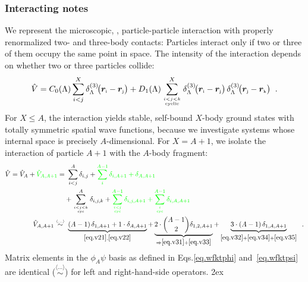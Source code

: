 \documentclass[aps,prd,onecolumn
,tightenlines,letterpaper,
notitlepage,11pt,
nofootinbib]{revtex4-1}
\begin{document}
\subsubsection{Interacting notes}
We represent the microscopic, \ie, particle-particle interaction with properly
renormalized two- and three-body contacts: Particles interact only if two or three
of them occupy the same point in space. The intensity of the interaction depends
on whether two or three particles collide:
\[
\hat{V}=C_0(\Lambda)\sum_{i<j}^X\ddrei{\vsp{i}-\vsp{j}}+
D_1(\Lambda)\sum^X_{i<j<k\atop\text{\tiny cyclic}}\ddrei{\vsp{i}-\vsp{j}}\,
\ddrei{\vsp{j}-\vsp{k}}\;\;.
\la{eq.int}\]
For $X\leq A$, the interaction yields stable, self-bound $X$-body ground states with
totally symmetric spatial wave functions, because we investigate systems whose
internal space is precisely $A$-dimensional.
For $X=A+1$, we isolate the interaction of particle $A+1$ with the $A$-body fragment:
\begin{align*}
\hat{V}=\hat{V}_A+\green{\hat{V}_{A,A+1}}=&~
\sum_{i<j}^A\delta_{i,j}+\green{\sum_{i}^{A-1}\delta_{i,A+1}+\delta_{A,A+1}}\\
&+\sum_{i<j<k\atop\text{\tiny cyc}}^A\delta_{i,j,k}+\green{\sum_{i<j\atop\text{\tiny cyc}}^{A-1}\delta_{i,j,A+1}+\sum_{i\atop\text{\tiny cyc}}^{A-1}\delta_{i,A,A+1}}\\
\hat{V}_{A,A+1}\stackrel{\scriptscriptstyle \langle\ldots\rangle}{\sim}&~
\underbrace{(A-1)\,\delta_{1,A+1}+1\cdot\delta_{A,A+1}}_{\eqref{eq.v21},\eqref{eq.v22}}+\underbrace{2\cdot{A-1\choose 2}
\delta_{1,2,A+1}}_{\Rightarrow\eqref{eq.v31}+\eqref{eq.v33}}+\underbrace{3\cdot(A-1)\,\delta_{1,A,A+1}}_{\eqref{eq.v32}+\eqref{eq.v34}+\eqref{eq.v35}}\;\;.
\la{eq.clint}\end{align*}
Matrix elements in the $\phi_A\psi$ basis as defined in Eqs.\eqref{eq.wfktphi}
and~\eqref{eq.wfktpsi} are identical
($\stackrel{\scriptscriptstyle \langle\ldots\rangle}{\sim}$) for left and right-hand-side
operators.
\newpage
\openup 2ex
\end{document}
